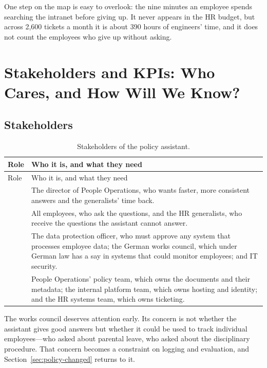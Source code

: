 One step on the map is easy to overlook: the nine minutes an employee spends searching the intranet before giving up. It never appears in the HR budget, but across 2{,}600 tickets a month it is about 390 hours of engineers' time, and it does not count the employees who give up without asking.

\section{Stakeholders and KPIs: Who Cares, and How Will We Know?}
\label{sec:policy-kpis}

\subsection{Stakeholders}

\begingroup
\small
\begin{xltabular}{\textwidth}{@{}>{\raggedright\arraybackslash}p{2.0cm}>{\raggedright\arraybackslash}X@{}}
\caption{Stakeholders of the policy assistant.}\label{tab:policy-stakeholders}\\
\toprule
{} Role & Who it is, and what they need \\
\midrule
\endfirsthead
\toprule
{} Role & Who it is, and what they need \\
\midrule
\endhead
{} & The director of People Operations, who wants faster, more consistent answers and the generalists' time back. \\
 & All employees, who ask the questions, and the HR generalists, who receive the questions the assistant cannot answer. \\
 & The data protection officer, who must approve any system that processes employee data; the German works council, which under German law has a say in systems that could monitor employees; and IT security. \\
 & People Operations' policy team, which owns the documents and their metadata; the internal platform team, which owns hosting and identity; and the HR systems team, which owns ticketing. \\
\bottomrule
\end{xltabular}
\endgroup

The works council deserves attention early. Its concern is not whether the assistant gives good answers but whether it could be used to track individual employees---who asked about parental leave, who asked about the disciplinary procedure. That concern becomes a constraint on logging and evaluation, and Section~\ref{sec:policy-changed} returns to it.

